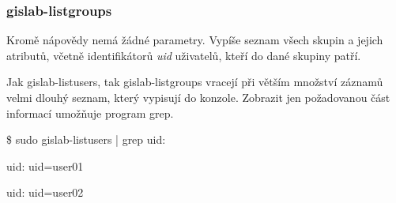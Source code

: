 \subsubsection{gislab-listgroups}
Kromě nápovědy nemá žádné parametry. Vypíše seznam všech skupin a jejich atributů, včetně identifikátorů \textit{uid} uživatelů, kteří do dané skupiny patří. 

Jak \textsf{gislab-listusers}, tak \textsf{gislab-listgroups} vracejí při větším množství záznamů velmi dlouhý seznam, který vypisují do konzole. Zobrazit jen požadovanou část informací umožňuje program grep.

\textsf{\$ sudo gislab-listusers | grep uid:}

\textsf{uid: uid=user01}

\textsf{uid: uid=user02}


